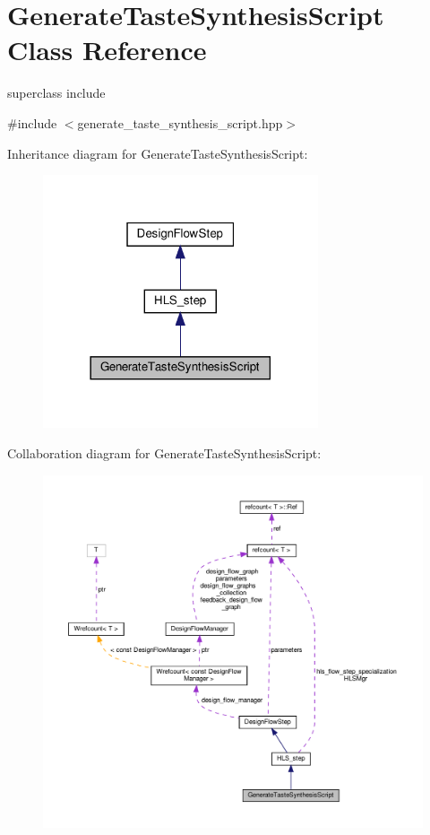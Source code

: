 \hypertarget{classGenerateTasteSynthesisScript}{}\section{Generate\+Taste\+Synthesis\+Script Class Reference}
\label{classGenerateTasteSynthesisScript}


superclass include  




{\ttfamily \#include $<$generate\+\_\+taste\+\_\+synthesis\+\_\+script.\+hpp$>$}



Inheritance diagram for Generate\+Taste\+Synthesis\+Script\+:
\nopagebreak
\begin{figure}[H]
\begin{center}
\leavevmode
\includegraphics[width=230pt]{dd/dc9/classGenerateTasteSynthesisScript__inherit__graph}
\end{center}
\end{figure}


Collaboration diagram for Generate\+Taste\+Synthesis\+Script\+:
\nopagebreak
\begin{figure}[H]
\begin{center}
\leavevmode
\includegraphics[width=350pt]{d8/daa/classGenerateTasteSynthesisScript__coll__graph}
\end{center}
\end{figure}
